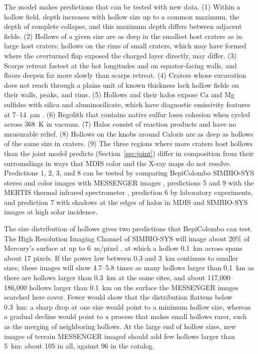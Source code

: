 \documentclass[article,review]{planetary}
\begin{document}
The model makes predictions that can be tested with new data. (1) Within a hollow field, depth increases with hollow size up to a common maximum, the depth of complete collapse, and this maximum depth differs between adjacent fields. (2) Hollows of a given size are as deep in the smallest host craters as in large host craters; hollows on the rims of small craters, which may have formed where the overturned flap exposed the charged layer directly, may differ. (3) Scarps retreat fastest at the hot longitudes and on equator-facing walls, and floors deepen far more slowly than scarps retreat. (4) Craters whose excavation does not reach through a plains unit of known thickness lack hollow fields on their walls, peaks, and rims. (5) Hollows and their halos expose Ca and Mg sulfides with silica and aluminosilicate, which have diagnostic emissivity features at 7--14~$\mu$m \parencite{renggli2023}. (6) Regolith that contains native sulfur loses cohesion when cycled across 368~K in vacuum. (7) Halos consist of reaction products and have no measurable relief. (8) Hollows on the knobs around Caloris are as deep as hollows of the same size in craters. (9) The three regions where more craters host hollows than the joint model predicts (Section~\ref{sec:joint}) differ in composition from their surroundings in ways that MDIS color and the X-ray maps do not resolve. Predictions 1, 2, 3, and 8 can be tested by comparing BepiColombo SIMBIO-SYS stereo and color images \parencite{cremonese2020,rothery2020} with MESSENGER images \parencite{speyerer2022,deutsch2025}, predictions 5 and 9 with the MERTIS thermal infrared spectrometer \parencite{hiesinger2020}, prediction 6 by laboratory experiments, and prediction 7 with shadows at the edges of halos in MDIS and SIMBIO-SYS images at high solar incidence.

The size distribution of hollows gives two predictions that BepiColombo can test. The High Resolution Imaging Channel of SIMBIO-SYS will image about 20\% of Mercury's surface at up to 6~m/pixel \parencite{cremonese2020}, at which a hollow 0.1~km across spans about 17 pixels. If the power law between 0.3 and 3~km continues to smaller sizes, these images will show 4.7--5.8 times as many hollows larger than 0.1~km as there are hollows larger than 0.3~km at the same sites, and about 117,000--186,000 hollows larger than 0.1~km on the surface the MESSENGER images searched here cover. Fewer would show that the distribution flattens below 0.3~km: a sharp drop at one size would point to a minimum hollow size, whereas a gradual decline would point to a process that makes small hollows rarer, such as the merging of neighboring hollows. At the large end of hollow sizes, new images of terrain MESSENGER imaged should add few hollows larger than 5~km: about 105 in all, against 96 in the catalog.
\end{document}
